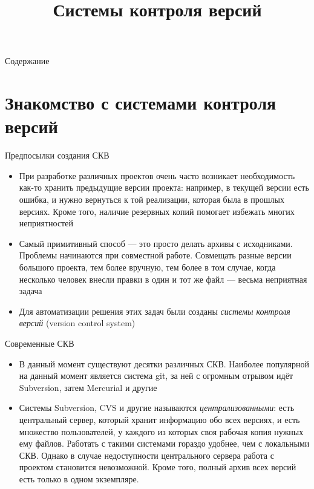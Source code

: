 \documentclass{beamer}
\title{Системы контроля версий}
\date{}
\begin{document}
\begin{frame}
	\maketitle
\end{frame}

\begin{frame}[allowframebreaks]{Содержание}
	\tableofcontents
\end{frame}

\section{Знакомство с системами контроля версий}

\begin{frame}{Предпосылки создания СКВ}
	\begin{itemize}
		\item{При разработке различных проектов очень часто возникает необходимость как-то хранить предыдущие версии проекта: например, в текущей версии есть ошибка, и нужно вернуться к той реализации, которая была в прошлых версиях. Кроме того, наличие резервных копий помогает избежать многих неприятностей}\pause
		\item{Самый примитивный способ --- это просто делать архивы с исходниками. Проблемы начинаются при совместной работе. Совмещать разные версии большого проекта, тем более вручную, тем более в том случае, когда несколько человек внесли правки в один и тот же файл --- весьма неприятная задача}\pause
		\item{Для автоматизации решения этих задач были созданы \emph{системы контроля версий} (version control system)}
	\end{itemize}	
\end{frame}

\begin{frame}{Современные СКВ}
	\begin{itemize}
		\item{В данный момент существуют десятки различных СКВ. Наиболее популярной на данный момент является система git, за ней с огромным отрывом идёт Subversion, затем Mercurial и другие}\pause 
		\item{Системы Subversion, CVS и другие называются \emph{централизованными}: есть центральный сервер, который хранит информацию обо всех версиях, и есть множество пользователей, у каждого из которых своя рабочая копия нужных ему файлов. Работать с такими системами гораздо удобнее, чем с локальными СКВ. Однако в случае недоступности центрального сервера работа с проектом становится невозможной. Кроме того, полный архив всех версий есть только в одном экземпляре.}
	\end{itemize}
\end{frame}
\end{document}
